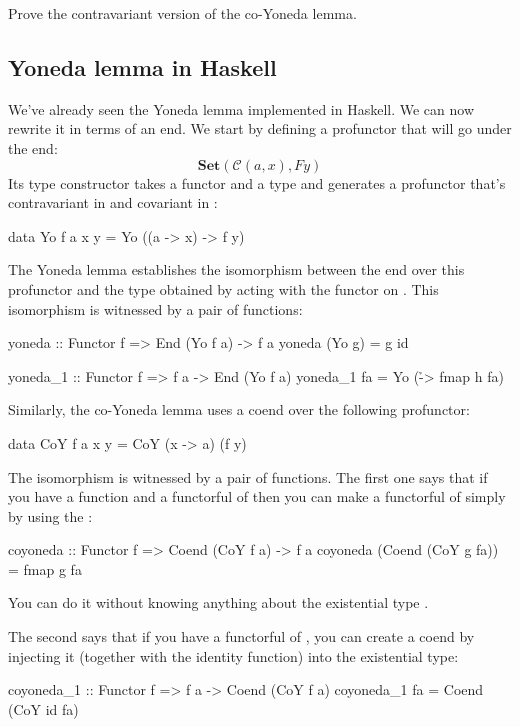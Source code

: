 \documentclass[DaoFP]{subfiles}
\begin{document}
\begin{exercise}
Prove the contravariant version of the co-Yoneda lemma.
\end{exercise}

\subsection{Yoneda lemma in Haskell}

We've already seen the Yoneda lemma implemented in Haskell. We can now rewrite it in terms of an end. We start by defining a profunctor that will go under the end:
\[ \mathbf{Set} (\mathcal{C}(a, x), F y) \]
Its type constructor takes a functor  and a type  and generates a profunctor that's contravariant in  and covariant in :
\begin{haskell}
data Yo f a x y = Yo ((a -> x) -> f y)
\end{haskell}
The Yoneda lemma establishes the isomorphism between the end over this profunctor and the type obtained by acting with the functor   on . This isomorphism is witnessed by a pair of functions:
\begin{haskell}
yoneda :: Functor f => End (Yo f a) -> f a
yoneda (Yo g) = g id

yoneda_1 :: Functor f => f a -> End (Yo f a)
yoneda_1 fa = Yo (\h -> fmap h fa)
\end{haskell}

Similarly, the co-Yoneda lemma uses a coend over the following profunctor:
\begin{haskell}
data CoY f a x y = CoY (x -> a) (f y)
\end{haskell}
The isomorphism is witnessed by a pair of functions. The first one says that if you have a function  and a functorful of  then you can make a functorful of  simply by using the :
\begin{haskell}
coyoneda :: Functor f => Coend (CoY f a) -> f a
coyoneda (Coend (CoY g fa)) = fmap g fa
\end{haskell}
You can do it without knowing anything about the existential type .

The second says that if you have a functorful of , you can create a coend by injecting it (together with the identity function) into the existential type:
\begin{haskell}
coyoneda_1 :: Functor f => f a -> Coend (CoY f a)
coyoneda_1 fa = Coend (CoY id fa)
\end{haskell}
\end{document}
